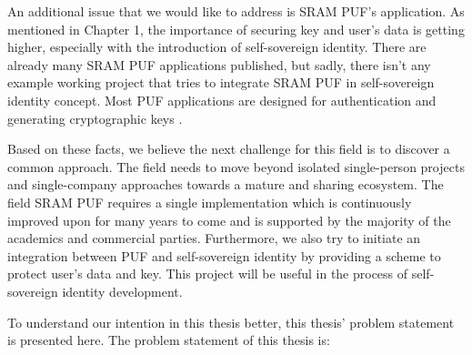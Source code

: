 An additional issue that we would like to address is SRAM PUF's application. As mentioned in Chapter 1, the importance of securing key and user's data is getting higher, especially with the introduction of self-sovereign identity. There are already many SRAM PUF applications published, but sadly, there isn't any example working project that tries to integrate SRAM PUF in self-sovereign identity concept. Most PUF applications are designed for authentication \cite{Tuyls2007} \cite{delvaux} \cite{Suh:2007:PUF:1278480.1278484} \cite{10.1007/978-3-642-04474-8_22} \cite{10.1007/978-3-642-10838-9_22} \cite{10.1007/978-3-319-29078-2_5}
and generating cryptographic keys \cite{Suh:2007:PUF:1278480.1278484} \cite{10.1007/978-3-642-33027-8_18}.

Based on these facts, we believe the next challenge for this field is to discover a common approach. The field needs to move beyond isolated single-person projects and single-company approaches towards a mature and sharing ecosystem. The field SRAM PUF requires a single implementation which is continuously improved upon for many years to come and is supported by the majority of the academics and commercial parties.
Furthermore, we also try to initiate an integration between PUF and self-sovereign identity by providing a scheme to protect user's data and key. This project will be useful in the process of self-sovereign identity development.

To understand our intention in this thesis better, this thesis' problem statement is presented here. The problem statement of this thesis is:

\begin{adjustwidth}{1cm}{1cm}
		\textit{\problemStatement}
\end{adjustwidth}

